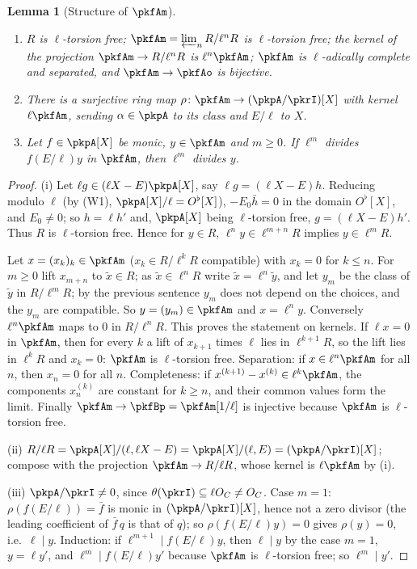 \documentclass[10pt]{amsart}
\newtheorem{lemma}[theorem]{Lemma}
\theoremstyle{definition}
\theoremstyle{remark}
\begin{document}
\begin{lemma}[Structure of $\pkfAm$]\label{pkr:Amax}
\begin{enumerate}
\item[(i)] $R$ is $\ell$-torsion free; $\pkfAm=\varprojlim_nR/\ell^nR$ is $\ell$-torsion free; the kernel
of the projection $\pkfAm\to R/\ell^nR$ is $\ell^n\pkfAm$; $\pkfAm$ is $\ell$-adically complete and
separated, and $\pkfAm\to\pkfAo$ is bijective.
\item[(ii)] There is a surjective ring map $\rho\colon\pkfAm\to(\pkpA/\pkrI)[X]$ with kernel
$\ell\pkfAm$, sending $\alpha\in\pkpA$ to its class and $E/\ell$ to $X$.
\item[(iii)] Let $f\in\pkpA[X]$ be monic, $y\in\pkfAm$ and $m\ge0$. If $\ell^m$ divides $f(E/\ell)y$ in
$\pkfAm$, then $\ell^m$ divides $y$.
\end{enumerate}
\end{lemma}

\begin{proof}
(i) Let $\ell g\in(\ell X-E)\pkpA[X]$, say $\ell g=(\ell X-E)h$. Reducing modulo $\ell$ (by (W1),
$\pkpA[X]/\ell=O^\flat[X]$), $-E_0\bar h=0$ in the domain $O^\flat[X]$, and $E_0\ne0$; so $h=\ell h'$
and, $\pkpA[X]$ being $\ell$-torsion free, $g=(\ell X-E)h'$. Thus $R$ is $\ell$-torsion free. Hence for
$y\in R$, $\ell^ny\in\ell^{m+n}R$ implies $y\in\ell^mR$.

Let $x=(x_k)_k\in\pkfAm$ ($x_k\in R/\ell^kR$ compatible) with $x_k=0$ for $k\le n$. For $m\ge0$ lift
$x_{m+n}$ to $\tilde x\in R$; as $\tilde x\in\ell^nR$ write $\tilde x=\ell^n\tilde y$, and let $y_m$ be
the class of $\tilde y$ in $R/\ell^mR$; by the previous sentence $y_m$ does not depend on the
choices, and the $y_m$ are compatible. So $y=(y_m)\in\pkfAm$ and $x=\ell^ny$. Conversely $\ell^n\pkfAm$
maps to $0$ in $R/\ell^nR$. This proves the statement on kernels. If $\ell x=0$ in $\pkfAm$, then
for every $k$ a lift of $x_{k+1}$ times $\ell$ lies in $\ell^{k+1}R$, so the lift lies in $\ell^kR$ and
$x_k=0$: $\pkfAm$ is $\ell$-torsion free. Separation: if $x\in\ell^n\pkfAm$ for all $n$, then $x_n=0$ for
all $n$. Completeness: if $x^{(k+1)}-x^{(k)}\in\ell^k\pkfAm$, the components $x^{(k)}_n$ are constant
for $k\ge n$, and their common values form the limit. Finally $\pkfAm\to\pkfBp=\pkfAm[1/\ell]$ is
injective because $\pkfAm$ is $\ell$-torsion free.

(ii) $R/\ell R=\pkpA[X]/(\ell,\ell X-E)=\pkpA[X]/(\ell,E)=(\pkpA/\pkrI)[X]$; compose with the projection
$\pkfAm\to R/\ell R$, whose kernel is $\ell\pkfAm$ by (i).

(iii) $\pkpA/\pkrI\ne0$, since $\theta(\pkrI)\subseteq\ell O_C\ne O_C$. Case $m=1$: $\rho(f(E/\ell))=\bar f$
is monic in $(\pkpA/\pkrI)[X]$, hence not a zero divisor (the leading coefficient of $\bar f\,q$ is
that of $q$); so $\rho(f(E/\ell)y)=0$ gives $\rho(y)=0$, i.e.\ $\ell\mid y$. Induction: if $\ell^{m+1}
\mid f(E/\ell)y$, then $\ell\mid y$ by the case $m=1$, $y=\ell y'$, and $\ell^m\mid f(E/\ell)y'$ because
$\pkfAm$ is $\ell$-torsion free; so $\ell^m\mid y'$.
\end{proof}
\end{document}
